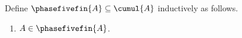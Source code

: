 
\begin{inductive}\label{phase5_fin}
    Define $\phasefivefin{A}\subseteq\cumul{A}$ inductively as follows.
    \begin{enumerate}
        \item $A\in\phasefivefin{A}$.
    \end{enumerate}
\end{inductive}
